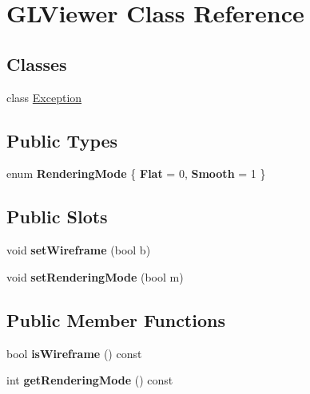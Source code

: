 \hypertarget{class_g_l_viewer}{
\section{GLViewer Class Reference}
\label{class_g_l_viewer}
}
\subsection*{Classes}
\begin{DoxyCompactItemize}
\item 
class \hyperlink{class_g_l_viewer_1_1_exception}{Exception}
\end{DoxyCompactItemize}
\subsection*{Public Types}
\begin{DoxyCompactItemize}
\item 
enum {\bfseries RenderingMode} \{ {\bfseries Flat} = 0, 
{\bfseries Smooth} = 1
 \}
\end{DoxyCompactItemize}
\subsection*{Public Slots}
\begin{DoxyCompactItemize}
\item 
\hypertarget{class_g_l_viewer_a9fb825fd9a6e4ae542018822b16c8eee}{
void {\bfseries setWireframe} (bool b)}
\label{class_g_l_viewer_a9fb825fd9a6e4ae542018822b16c8eee}

\item 
\hypertarget{class_g_l_viewer_a57f4dc0af322632953bf180d804ecb19}{
void {\bfseries setRenderingMode} (bool m)}
\label{class_g_l_viewer_a57f4dc0af322632953bf180d804ecb19}

\end{DoxyCompactItemize}
\subsection*{Public Member Functions}
\begin{DoxyCompactItemize}
\item 
\hypertarget{class_g_l_viewer_a5ea5425e2ad3333b90a82032d71bbaea}{
bool {\bfseries isWireframe} () const }
\label{class_g_l_viewer_a5ea5425e2ad3333b90a82032d71bbaea}

\item 
\hypertarget{class_g_l_viewer_affe3dc7c0ffc0a626ddfd7fa46c49b00}{
int {\bfseries getRenderingMode} () const }
\label{class_g_l_viewer_affe3dc7c0ffc0a626ddfd7fa46c49b00}

\end{DoxyCompactItemize}
